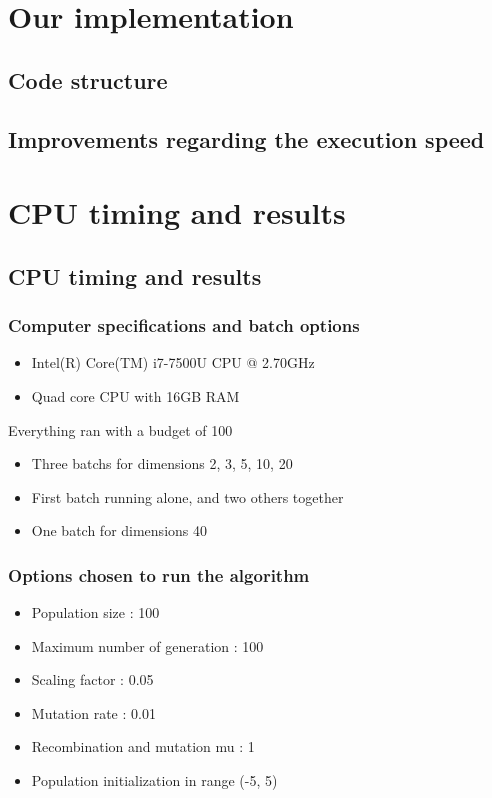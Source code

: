 \documentclass{beamer}
\begin{document}
\section{Our implementation}
\subsection{Code structure}
\begin{frame}

\end{frame}

\subsection{Improvements regarding the execution speed}
\begin{frame}

\end{frame}

\section{CPU timing and results}
\subsection{CPU timing and results}
\begin{frame}
  \frametitle{Computer specifications and batch options}
  \begin{itemize}
  \item Intel(R) Core(TM) i7-7500U CPU @ 2.70GHz
  \item Quad core CPU with 16GB RAM
  \end{itemize}
  \vspace{1em}
  Everything ran with a budget of 100\\
  \begin{itemize}
  \item Three batchs for dimensions 2, 3, 5, 10, 20
  \item First batch running alone, and two others together
  \item One batch for dimensions 40
  \end{itemize}
\end{frame}

\begin{frame}
  \frametitle{Options chosen to run the algorithm}
  \begin{itemize}
  \item Population size : 100
  \item Maximum number of generation : 100
  \item Scaling factor : 0.05
  \item Mutation rate : 0.01
  \item Recombination and mutation mu : 1
  \item Population initialization in range (-5, 5)
  \end{itemize}
\end{frame}
\end{document}

